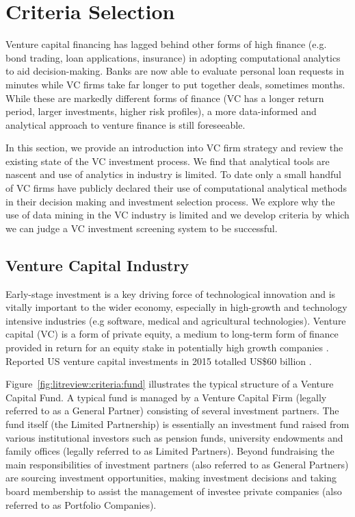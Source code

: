 \documentclass[../thesis/thesis.tex]{subfiles}
\begin{document}
\section{Criteria Selection}

Venture capital financing has lagged behind other forms of high finance (e.g. bond trading, loan applications, insurance) in adopting computational analytics to aid decision-making. Banks are now able to evaluate personal loan requests in minutes while VC firms take far longer to put together deals, sometimes months. While these are markedly different forms of finance (VC has a longer return period, larger investments, higher risk profiles), a more data-informed and analytical approach to venture finance is still foreseeable.

In this section, we provide an introduction into VC firm strategy and review the existing state of the VC investment process. We find that analytical tools are nascent and use of analytics in industry is limited. To date only a small handful of VC firms have publicly declared their use of computational analytical methods in their decision making and investment selection process. We explore why the use of data mining in the VC industry is limited and we develop criteria by which we can judge a VC investment screening system to be successful.

\subsection{Venture Capital Industry}

Early-stage investment is a key driving force of technological innovation and is vitally important to the wider economy, especially in high-growth and technology intensive industries (e.g software, medical and agricultural technologies). Venture capital (VC) is a form of private equity, a medium to long-term form of finance provided in return for an equity stake in potentially high growth companies \cite{nvca2016}. Reported US venture capital investments in 2015 totalled US\$60 billion \cite{nvca2016}.

Figure~\ref{fig:litreview:criteria:fund} illustrates the typical structure of a Venture Capital Fund. A typical fund is managed by a Venture Capital Firm (legally referred to as a General Partner) consisting of several investment partners. The fund itself (the Limited Partnership) is essentially an investment fund raised from various institutional investors such as pension funds, university endowments and family offices (legally referred to as Limited Partners). Beyond fundraising the main responsibilities of investment partners (also referred to as General Partners) are sourcing investment opportunities, making investment decisions and taking board membership to assist the management of investee private companies (also referred to as Portfolio Companies).
\end{document}
